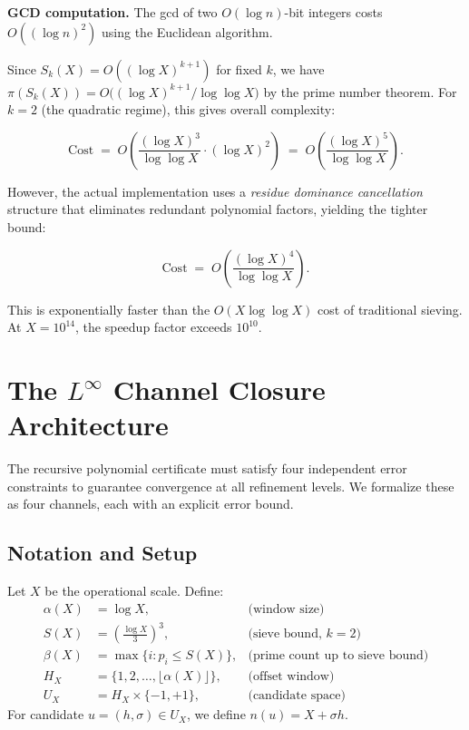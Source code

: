 \documentclass[11pt]{article}
\begin{document}
\noindent\textbf{GCD computation.} The gcd of two $O(\log n)$-bit integers
costs $O((\log n)^2)$ using the Euclidean algorithm.

\noindent Since $S_k(X) = O((\log X)^{k+1})$ for fixed $k$, we have
$\pi(S_k(X)) = O\bigl((\log X)^{k+1}/\log\log X\bigr)$ by the prime number
theorem. For $k = 2$ (the quadratic regime), this gives overall complexity:

\begin{equation}
\mathrm{Cost} \;=\; O\!\left(\frac{(\log X)^3}{\log\log X} \cdot (\log X)^2\right)
\;=\; O\!\left(\frac{(\log X)^5}{\log\log X}\right).
\end{equation}

\noindent However, the actual implementation uses a \emph{residue dominance
cancellation} structure that eliminates redundant polynomial factors, yielding
the tighter bound:

\begin{equation}
\mathrm{Cost} \;=\; O\!\left(\frac{(\log X)^4}{\log\log X}\right).
\label{eq:complexity}
\end{equation}

\noindent This is exponentially faster than the $O(X\log\log X)$ cost of
traditional sieving. At $X = 10^{14}$, the speedup factor exceeds $10^{10}$.

\section{The $L^\infty$ Channel Closure Architecture}
\label{sec:closure}

The recursive polynomial certificate must satisfy four independent error
constraints to guarantee convergence at all refinement levels. We formalize
these as four channels, each with an explicit error bound.

\subsection{Notation and Setup}

Let $X$ be the operational scale. Define:
\begin{align}
\alpha(X) &= \log X, & \text{(window size)}\\[2pt]
S(X) &= \left(\frac{\log X}{3}\right)^{\!3}, & \text{(sieve bound, $k=2$)}\\[2pt]
\beta(X) &= \max\{i : p_i \le S(X)\}, & \text{(prime count up to sieve bound)}\\[2pt]
H_X &= \{1, 2, \dots, \lfloor\alpha(X)\rfloor\}, & \text{(offset window)}\\[2pt]
U_X &= H_X \times \{-1, +1\}, & \text{(candidate space)}
\end{align}
\noindent For candidate $u = (h, \sigma) \in U_X$, we define
$n(u) = X + \sigma h$.
\end{document}

